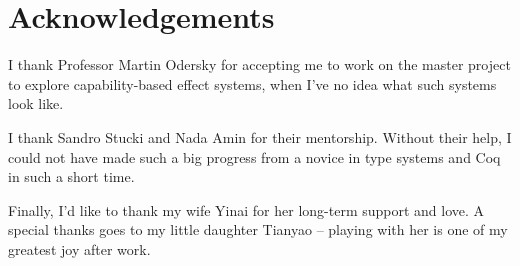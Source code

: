 \section*{\centering Acknowledgements}

I thank Professor Martin Odersky for accepting me to work on the
master project to explore capability-based effect systems, when I've
no idea what such systems look like.

I thank Sandro Stucki and Nada Amin for their mentorship. Without
their help, I could not have made such a big progress from a novice in
type systems and Coq in such a short time.

Finally, I'd like to thank my wife Yinai for her long-term support and
love. A special thanks goes to my little daughter Tianyao -- playing
with her is one of my greatest joy after work.
